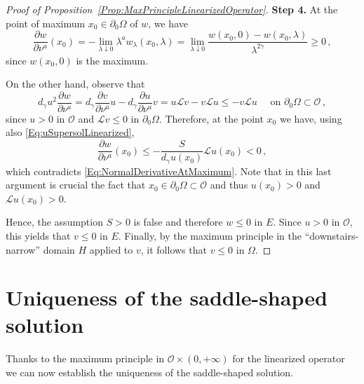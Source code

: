 \documentclass[12pt,reqno]{amsart}
\theoremstyle{definition}
\theoremstyle{remark}
\newcommand{\ocal}{\mathcal{O}}
\newcommand{\s}{\gamma}
\numberwithin{equation}{section}
\begin{document}
\begin{proof}[Proof of Proposition~\ref{Prop:MaxPrincipleLinearizedOperator}]
 

\textbf{Step 4.}
At the point of maximum $x_0 \in \partial_0 \Omega$ of $w$, we have
\begin{equation}
\label{Eq:NormalDerivativeAtMaximum}
\dfrac{\partial w}{\partial \nu^a}(x_0) = -\lim_{\lambda \downarrow 0} \lambda^a w_\lambda (x_0,\lambda) = \lim_{\lambda \downarrow 0} \dfrac{w(x_0,0) - w(x_0, \lambda)}{\lambda^{2\s}} \geq 0\,,
\end{equation}
since $w(x_0,0)$ is the maximum.

On the other hand, observe that
$$
d_\s u^2 \dfrac{\partial w}{\partial \nu^a} = d_\s  \dfrac{\partial v}{\partial \nu^a} u  - d_\s  \dfrac{\partial u}{\partial \nu^a} v = u \mathscr{L}v  -  v \mathscr{L}u \leq -v \mathscr{L}u \quad \text{ on } \partial_0 \Omega \subset \ocal\,,
$$
since $u>0$ in $\ocal$ and $\mathscr{L}v \leq 0$ in $\partial_0 \Omega $. Therefore, at the point $x_0$ we have, using also \eqref{Eq:uSupersolLinearized}, 
$$
\dfrac{\partial w}{\partial \nu^a}(x_0) \leq -\dfrac{S}{d_\s u(x_0)} \mathscr{L}u(x_0) < 0\,,
$$
which contradicts \eqref{Eq:NormalDerivativeAtMaximum}. Note that in this last argument is crucial the fact that $x_0 \in \partial_0 \Omega \subset \ocal$ and thus $u(x_0)>0$ and $\mathscr{L}u (x_0) > 0$. 

Hence, the assumption $S>0$ is false and therefore $w \leq 0$ in $E$. Since $u > 0$ in $\ocal$, this yields that $v \leq 0$ in $E$. Finally, by the maximum principle in the ``downstairs-narrow'' domain $H$ applied to $v$, it follows that $v\leq 0$ in $\Omega$.
\end{proof}



\section{Uniqueness of the saddle-shaped solution}
\label{Sec:Uniqueness}
Thanks to the maximum principle in $\ocal\times (0,+\infty)$ for the linearized operator we can now establish the uniqueness of the saddle-shaped solution.
\end{document}
